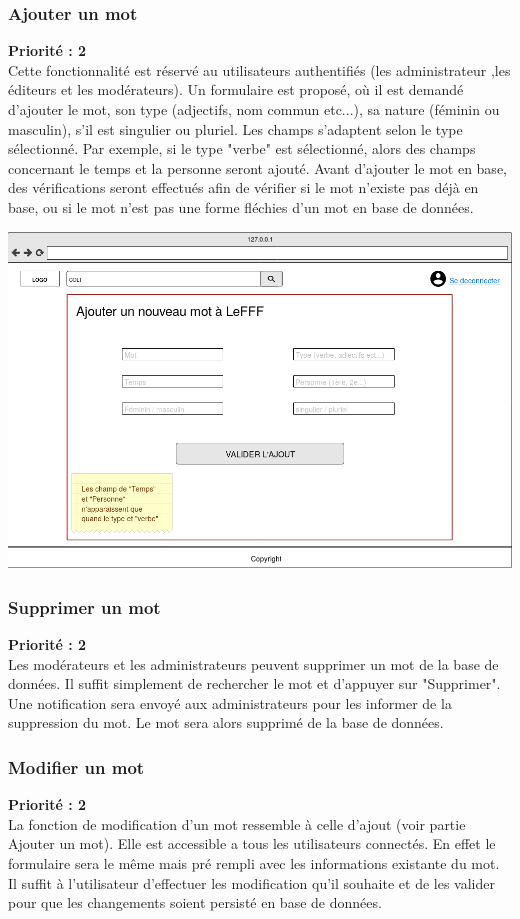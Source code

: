 \documentclass[12pt,a4paper]{article}
\begin{document}
\subsubsection{Ajouter un mot}
 \textbf{Priorité : 2}
\\ Cette fonctionnalité est réservé au utilisateurs authentifiés (les administrateur ,les éditeurs et les modérateurs). Un formulaire est proposé, où il est demandé d'ajouter le mot, son type (adjectifs, nom commun etc...), sa nature (féminin ou masculin), s'il est singulier ou pluriel. Les champs s'adaptent selon le type sélectionné. Par exemple, si le type "verbe" est sélectionné, alors des champs concernant le temps et la personne seront ajouté.
Avant d'ajouter le mot en base, des vérifications seront effectués afin  de vérifier si le mot n'existe pas déjà en base, ou si le mot n'est pas une forme fléchies d'un mot en base de données.
\begin{center}\includegraphics[width=150mm]{img/add_modif_screen.png}\end{center}

\subsubsection{Supprimer un mot}
 \textbf{Priorité : 2} \\ 
 Les modérateurs et les administrateurs peuvent supprimer un mot de la base de données. Il suffit simplement de rechercher le mot et d'appuyer sur "Supprimer". Une notification sera envoyé aux administrateurs pour les informer de la suppression du mot. Le mot sera alors supprimé de la base de données.

\subsubsection{Modifier un mot}
 \textbf{Priorité : 2} \\ 
 La fonction de modification d'un mot ressemble à celle d'ajout (voir partie Ajouter un mot). Elle est accessible a tous les utilisateurs connectés. En effet le formulaire sera le même mais pré rempli avec les informations existante du mot. Il suffit à  l'utilisateur d'effectuer les modification qu'il souhaite et de les valider pour que les changements soient persisté en base de données.
\end{document}
